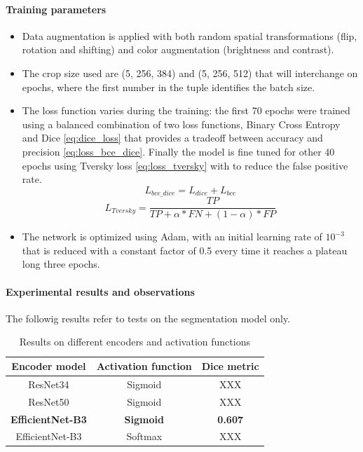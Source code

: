\documentclass[10pt,twocolumn,letterpaper]{article}
\begin{document}
      \paragraph{Training parameters}
         \begin{itemize}
            \item Data augmentation is applied with both random spatial transformations (flip, rotation and shifting) and color augmentation (brightness and contrast).
            \item The crop size used are (5, 256, 384) and (5, 256, 512) that will interchange on epochs, where the first number in the tuple identifies the batch size.
            \item The loss function varies during the training: the first 70 epochs were trained using a balanced combination of two loss functions, Binary Cross Entropy and Dice \eqref{eq:dice_loss} that provides a tradeoff between accuracy and precision \eqref{eq:loss_bce_dice}. Finally the model is fine tuned for other 40 epochs using Tversky loss \eqref{eq:loss_tversky} with  to reduce the false positive rate. 
            \begin{equation}\label{eq:loss_bce_dice}
               L_{bce\_dice} = L_{dice} + L_{bce}
            \end{equation}
            \begin{equation}\label{eq:loss_tversky}
               L_{Tversky} = \frac{TP}{TP + \alpha*FN + (1-\alpha)*FP}
            \end{equation}
            \item The network is optimized using Adam, with an initial learning rate of $ 10^{-3} $ that is reduced with a constant factor of 0.5 every time it reaches a plateau long three epochs.
         \end{itemize}

      \paragraph{Experimental results and observations}
         The followig results refer to tests on the segmentation model only.
         \begin{table}[h]
            \centering
            \begin{tabular}{||c c c||} 
            \hline
            Encoder model & Activation function & Dice metric\\ [0.4ex] 
            \hline\hline
            ResNet34 & Sigmoid & XXX \\ 
            \hline
            ResNet50 & Sigmoid & XXX \\
            \hline
            \textbf{EfficientNet-B3} & \textbf{Sigmoid} & \textbf{0.607} \\
            \hline
            EfficientNet-B3 & Softmax & XXX \\
            \hline
            \end{tabular}
            \caption{Results on different encoders and activation functions}
            \label{table:res_encoders}
         \end{table}
\end{document}
